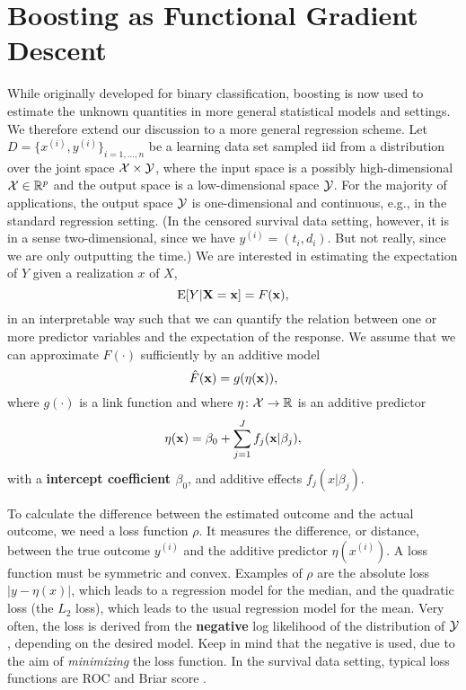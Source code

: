 \section{Boosting as Functional Gradient Descent}
While originally developed for binary classification, boosting is now used to estimate the unknown quantities in more general statistical models and settings. We therefore extend our discussion to a more general regression scheme. Let $D=\{x^{(i)},y^{(i)}\}_{i=1,\ldots,n}$ be a learning data set sampled iid from a distribution over the joint space $\mathcal{X}\times\mathcal{Y}$, where the input space is a possibly high-dimensional $\mathcal{X}\in\mathbb{R}^p$ and the output space is a low-dimensional space $\mathcal{Y}$. For the majority of applications, the output space $\mathcal{Y}$ is one-dimensional and continuous, e.g., in the standard regression setting. (In the censored survival data setting, however, it is in a sense two-dimensional, since we have $y^{(i)}=(t_i,d_i)$. But not really, since we are only outputting the time.) We are interested in estimating the expectation of $Y$ given a realization $x$ of $X$,
\begin{equation*}
    \operatorname{E}[Y|\mathbf{X}=\mathbf{x}]=F(\mathbf{x}),
\end{equation*}
in an interpretable way such that we can quantify the relation between one or more predictor variables and the expectation of the response. We assume that we can approximate $F(\cdot)$ sufficiently by an additive model
\begin{equation}
    \hat{F}(\mathbf{x})=g(\eta(\mathbf{x})),
\end{equation}
where $g(\cdot)$ is a link function and where $\eta\colon\mathcal{X}\to\mathbb{R}$ is an additive predictor
\begin{equation}\label{eq:eta}
    \eta(\mathbf{x})=\beta_0+\sum_{j=1}^Jf_j(\mathbf{x}|\beta_j),
\end{equation}
with a \textbf{intercept coefficient $\beta_0$}, and additive effects $f_j(x|\beta_j)$.

To calculate the difference between the estimated outcome and the actual outcome, we need a loss function $\rho$. It measures the difference, or distance, between the true outcome $y^{(i)}$ and the additive predictor $\eta(x^{(i)})$. A loss function must be symmetric and convex. Examples of $\rho$ are the absolute loss $|y-\eta(x)|$, which leads to a regression model for the median, and the quadratic loss (the $L_2$ loss), which leads to the usual regression model for the mean. Very often, the loss is derived from the \textbf{negative} log likelihood of the distribution of $\mathcal{Y}$, depending on the desired model. Keep in mind that the negative is used, due to the aim of \textit{minimizing} the loss function. In the survival data setting, typical loss functions are ROC and Briar score \citep{bovelstadborgan}.

